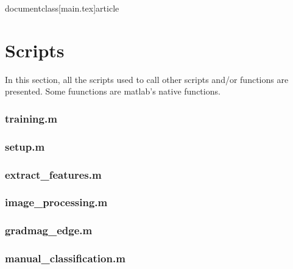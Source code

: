 documentclass[main.tex]{article}


\newpage
\appendix \label{appendix}

\section{Scripts}
In this section, all the scripts used to call other scripts and/or functions are presented. Some fuunctions are matlab's native functions.

\subsubsection*{\hypertarget{training}{training.m}}


\subsubsection*{\hypertarget{setup}{setup.m}}


\subsubsection*{\hypertarget{extractfeat}{extract\_features.m}}


\subsubsection*{\hypertarget{imageprocessing}{image\_processing.m}}


\subsubsection*{\hypertarget{gradmag}{gradmag\_edge.m}}


\subsubsection*{\hypertarget{manclf}{manual\_classification.m}}



